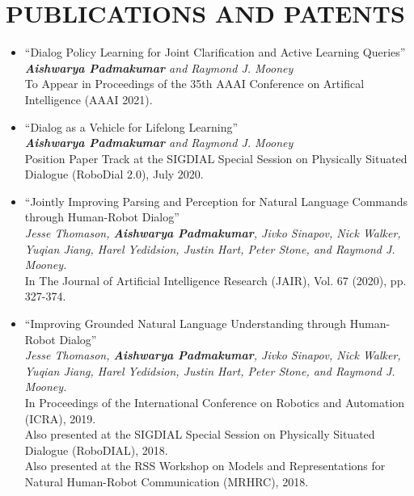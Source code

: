\documentclass[letterpaper,10pt]{resume}
\begin{document}
{\section{PUBLICATIONS AND PATENTS}
\begin{itemize}
\item ``Dialog Policy Learning for Joint Clarification and Active Learning Queries'' \\
\textit{\textbf{Aishwarya Padmakumar} and Raymond J. Mooney} \\
To Appear in Proceedings of the 35th AAAI Conference on Artifical Intelligence (AAAI 2021).
\vspace{0.2cm}

\item ``Dialog as a Vehicle for Lifelong Learning'' \\
\textit{\textbf{Aishwarya Padmakumar} and Raymond J. Mooney} \\
Position Paper Track at the SIGDIAL Special Session on Physically Situated Dialogue (RoboDial 2.0), July 2020.
\vspace{0.2cm}

\item  ``Jointly Improving Parsing and Perception for Natural Language Commands through Human-Robot Dialog'' \\
\textit{Jesse Thomason, \textbf{Aishwarya Padmakumar}, Jivko Sinapov, Nick Walker, Yuqian Jiang, Harel Yedidsion, Justin Hart, Peter Stone, and Raymond J. Mooney.} \\
In The Journal of Artificial Intelligence Research (JAIR), Vol. 67 (2020), pp. 327-374.
\vspace{0.2cm}

\item  ``Improving Grounded Natural Language Understanding through Human-Robot Dialog'' \\
\textit{Jesse Thomason, \textbf{Aishwarya Padmakumar}, Jivko Sinapov, Nick Walker, Yuqian Jiang, Harel Yedidsion, Justin Hart, Peter Stone, and Raymond J. Mooney.} \\
In Proceedings of the International Conference on Robotics and Automation (ICRA), 2019. \\
Also presented at the SIGDIAL Special Session on Physically Situated Dialogue (RoboDIAL), 2018. \\
Also presented at the RSS Workshop on Models and Representations for Natural Human-Robot Communication (MRHRC), 2018. 
\vspace{0.2cm}


\end{itemize}}
\end{document}
